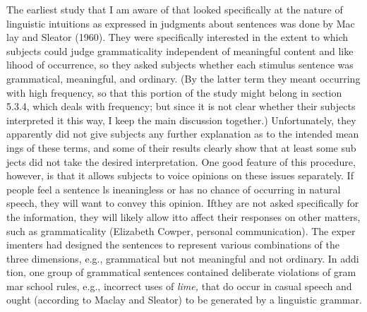 \begin{styleStandard}
The earliest study that I am aware of that looked specifically at the nature of linguistic intuitions as expressed in judgments about sentences was done by Mac\- lay and Sleator (1960). They were specifically interested in the extent to which subjects could judge grammaticality independent of meaningful content and like\- lihood of occurrence, so they asked subjects whether each stimulus sentence was grammatical, meaningful, and ordinary. (By the latter term they meant {\textquotedbl}occurring with high frequency,{\textquotedbl} so that this portion of the study might belong in section 5.3.4, which deals with frequency; but since it is not clear whether their subjects interpreted it this way, I keep the main discussion together.) Unfortunately, they apparently did not give subjects any further explanation as to the intended mean\- ings of these terms, and some of their results clearly show that at least some sub\- jects did not take the desired interpretation. One good feature of this procedure, however, is that it allows subjects to voice opinions on these issues separately. If people feel a sentence ls ineaningless or has no chance of occurring in natural speech, they will want to convey this opinion. Ifthey are not asked specifically for the information, they will likely allow itto affect their responses on other matters,\- such as grammaticality (Elizabeth Cowper, personal communication). The exper\- imenters had designed the sentences to represent various combinations of the three dimensions, e.g., grammatical but not meaningful and not ordinary. In addi\- tion, one group of grammatical sentences contained deliberate violations of {\textquotedbl}gram\- mar school{\textquotedbl} rules, e.g., incorrect uses of \textit{lime,}\textit{ }that do occur in casual speech and ought (according to Maclay and Sleator) to be generated by a linguistic grammar.
\end{styleStandard}


